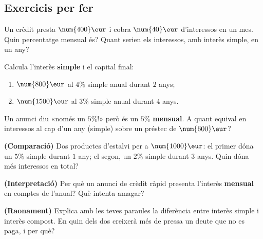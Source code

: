 \subsection{Exercicis per fer}

\begin{exercicis}
\begin{exlist}
  \item Un crèdit presta $\num{400}\eur$ i cobra $\num{40}\eur$ d'interessos en un mes.
        Quin percentatge mensual és? Quant serien els interessos, amb interès simple,
        en un any?
  \item Calcula l'interès \textbf{simple} i el capital final:
    \begin{enumerate}[label=\alph*), leftmargin=1.6em, topsep=2pt]
      \item $\num{800}\eur$ al $4\%$ simple anual durant $2$ anys;
      \item $\num{1500}\eur$ al $3\%$ simple anual durant $4$ anys.
    \end{enumerate}
  \item Un anunci diu «només un $5\%$!» però és un $5\%$ \textbf{mensual}. A quant
        equival en interessos al cap d'un any (simple) sobre un préstec de
        $\num{600}\eur$?
  \item \textbf{(Comparació)} Dos productes d'estalvi per a $\num{1000}\eur$: el primer
        dóna un $5\%$ simple durant $1$ any; el segon, un $2\%$ simple durant $3$ anys.
        Quin dóna més interessos en total?
  \item \textbf{(Interpretació)} Per què un anunci de crèdit ràpid presenta l'interès
        \textbf{mensual} en comptes de l'anual? Què intenta amagar?
  \item \textbf{(Raonament)} Explica amb les teves paraules la diferència entre interès
        simple i interès compost. En quin dels dos creixerà més de pressa un deute que
        no es paga, i per què?
\end{exlist}
\end{exercicis}

